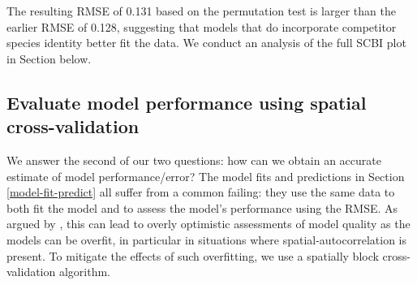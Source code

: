 \documentclass[12pt]{article}
\newenvironment{Shaded}{\begin{snugshade}}{\end{snugshade}}
\newcommand{\CommentTok}[1]{\textcolor[rgb]{0.56,0.35,0.01}{\textit{#1}}}
\newcommand{\DataTypeTok}[1]{\textcolor[rgb]{0.13,0.29,0.53}{#1}}
\newcommand{\KeywordTok}[1]{\textcolor[rgb]{0.13,0.29,0.53}{\textbf{#1}}}
\newcommand{\NormalTok}[1]{#1}
\newcommand{\OperatorTok}[1]{\textcolor[rgb]{0.81,0.36,0.00}{\textbf{#1}}}
\newcommand{\OtherTok}[1]{\textcolor[rgb]{0.56,0.35,0.01}{#1}}
\newcommand{\StringTok}[1]{\textcolor[rgb]{0.31,0.60,0.02}{#1}}
\begin{document}
\begin{Shaded}
\end{Shaded}

\begin{Shaded}
\end{Shaded}

The resulting RMSE of 0.131 based on the permutation test is larger than
the earlier RMSE of 0.128, suggesting that models that do incorporate
competitor species identity better fit the data. We conduct an analysis
of the full SCBI plot in Section below.

\hypertarget{spatial-cross-validation}{%
\subsection{Evaluate model performance using spatial
cross-validation}\label{spatial-cross-validation}}

We answer the second of our two questions: how can we obtain an accurate
estimate of model performance/error? The model fits and predictions in
Section \ref{model-fit-predict} all suffer from a common failing: they
use the same data to both fit the model and to assess the model's
performance using the RMSE. As argued by
\citet{roberts_cross-validation_2017}, this can lead to overly
optimistic assessments of model quality as the models can be overfit, in
particular in situations where spatial-autocorrelation is present. To
mitigate the effects of such overfitting, we use a spatially block
cross-validation algorithm.
\end{document}
